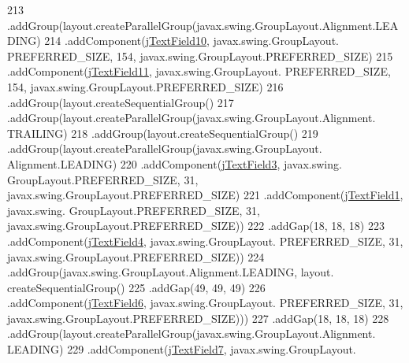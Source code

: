\begin{DoxyCode}
213                             .addGroup(layout.createParallelGroup(javax.swing.GroupLayout.Alignment.LEADING)
214                                 .addComponent(\mbox{\hyperlink{classsoftware_1_1parasoftware3_a8a6dfd58aa72b1900f0fd0dcf7302181}{jTextField10}}, javax.swing.GroupLayout.
      PREFERRED\_SIZE, 154, javax.swing.GroupLayout.PREFERRED\_SIZE)
215                                 .addComponent(\mbox{\hyperlink{classsoftware_1_1parasoftware3_a1936999315b749f7eb88a81dae02582b}{jTextField11}}, javax.swing.GroupLayout.
      PREFERRED\_SIZE, 154, javax.swing.GroupLayout.PREFERRED\_SIZE)
216                                 .addGroup(layout.createSequentialGroup()
217                                     .addGroup(layout.createParallelGroup(javax.swing.GroupLayout.Alignment.
      TRAILING)
218                                         .addGroup(layout.createSequentialGroup()
219                                             .addGroup(layout.createParallelGroup(javax.swing.GroupLayout.
      Alignment.LEADING)
220                                                 .addComponent(\mbox{\hyperlink{classsoftware_1_1parasoftware3_a19c3b86c1d29a59d3e2dca7ca6e34e35}{jTextField3}}, javax.swing.
      GroupLayout.PREFERRED\_SIZE, 31, javax.swing.GroupLayout.PREFERRED\_SIZE)
221                                                 .addComponent(\mbox{\hyperlink{classsoftware_1_1parasoftware3_a3415ad58f32ae42cfc88f7b498a2db38}{jTextField1}}, javax.swing.
      GroupLayout.PREFERRED\_SIZE, 31, javax.swing.GroupLayout.PREFERRED\_SIZE))
222                                             .addGap(18, 18, 18)
223                                             .addComponent(\mbox{\hyperlink{classsoftware_1_1parasoftware3_a49b508e80d5a8bb6886b95f79fc5446e}{jTextField4}}, javax.swing.GroupLayout.
      PREFERRED\_SIZE, 31, javax.swing.GroupLayout.PREFERRED\_SIZE))
224                                         .addGroup(javax.swing.GroupLayout.Alignment.LEADING, layout.
      createSequentialGroup()
225                                             .addGap(49, 49, 49)
226                                             .addComponent(\mbox{\hyperlink{classsoftware_1_1parasoftware3_a38ca1c67c4ebd2265e207c9c76ce72ad}{jTextField6}}, javax.swing.GroupLayout.
      PREFERRED\_SIZE, 31, javax.swing.GroupLayout.PREFERRED\_SIZE)))
227                                     .addGap(18, 18, 18)
228                                     .addGroup(layout.createParallelGroup(javax.swing.GroupLayout.Alignment.
      LEADING)
229                                         .addComponent(\mbox{\hyperlink{classsoftware_1_1parasoftware3_a32fd4ba8157830b2185c828121e52320}{jTextField7}}, javax.swing.GroupLayout.

\end{DoxyCode}
